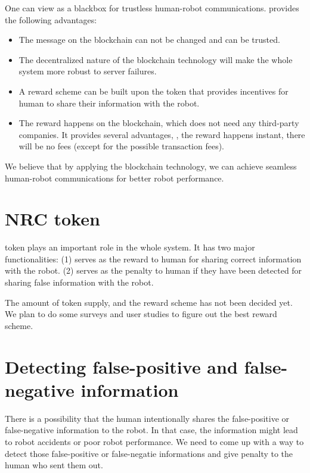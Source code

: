 \documentclass{article}
\begin{document}
One can view \nrc as a blackbox for trustless human-robot
communications. \nrc provides the following advantages:


\begin{itemize}
    \item The message on the blockchain can not be changed and can
        be trusted.
    \item The decentralized nature of the blockchain technology 
        will make the
        whole system more robust to server failures.
    \item A reward scheme can be built upon the \nrc token 
        that provides incentives for human to share their information
        with the robot.
    \item The reward happens on the blockchain, which does not
        need any third-party companies. It provides several
        advantages, \eg, the reward happens instant, there will
        be no fees (except for the possible transaction fees).
\end{itemize}


We believe that by applying the \nrc blockchain technology, we
can achieve seamless human-robot communications for better
robot performance.


\section{NRC token}

\nrc token plays an important role in the whole system. 
It has two major functionalities: 
(1) serves as the reward to human for sharing correct information 
with the robot.
(2) serves as the penalty to human if they have been detected for
sharing false information with the robot.


The amount of token supply, and the reward scheme has not
been decided yet. We plan to do some surveys and user studies
to figure out the best reward scheme. 


\section{Detecting false-positive and false-negative information}
\label{sec:detect}


There is a possibility that the human intentionally shares the
false-positive or false-negative information to the robot. In
that case, the information might lead to robot accidents or 
poor robot performance.
We need to come up with a way to detect those false-positive or
false-negatie informations and give penalty to the human who
sent them out. 
\end{document}

